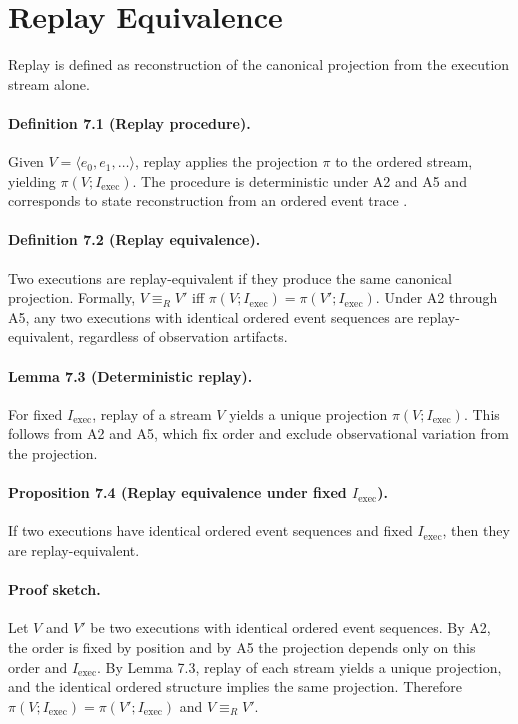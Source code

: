 \section{Replay Equivalence}

Replay is defined as reconstruction of the canonical projection from the execution stream alone.

\paragraph{Definition 7.1 (Replay procedure).}
Given $V = \langle e_0, e_1, \ldots \rangle$, replay applies the projection $\pi$ to the ordered stream, yielding $\pi(V; I_{\text{exec}})$. The procedure is deterministic under A2 and A5 and corresponds to state reconstruction from an ordered event trace \cite{lamport2002specifying}.

\paragraph{Definition 7.2 (Replay equivalence).}
Two executions are replay-equivalent if they produce the same canonical projection. Formally, $V \equiv_R V'$ iff $\pi(V; I_{\text{exec}}) = \pi(V'; I_{\text{exec}})$. Under A2 through A5, any two executions with identical ordered event sequences are replay-equivalent, regardless of observation artifacts.

\paragraph{Lemma 7.3 (Deterministic replay).}
For fixed $I_{\text{exec}}$, replay of a stream $V$ yields a unique projection $\pi(V; I_{\text{exec}})$. This follows from A2 and A5, which fix order and exclude observational variation from the projection.

\paragraph{Proposition 7.4 (Replay equivalence under fixed $I_{\text{exec}}$).}
If two executions have identical ordered event sequences and fixed $I_{\text{exec}}$, then they are replay-equivalent.

\paragraph{Proof sketch.}
Let $V$ and $V'$ be two executions with identical ordered event sequences. By A2, the order is fixed by position and by A5 the projection depends only on this order and $I_{\text{exec}}$. By Lemma 7.3, replay of each stream yields a unique projection, and the identical ordered structure implies the same projection. Therefore $\pi(V; I_{\text{exec}}) = \pi(V'; I_{\text{exec}})$ and $V \equiv_R V'$.

